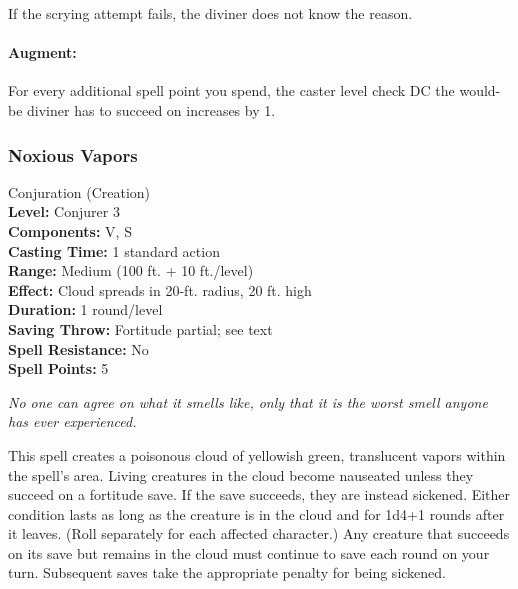 If the scrying attempt fails, the diviner does not know the reason.

\paragraph{Augment:} For every additional spell point you spend, the caster level check DC the would-be diviner has to succeed on increases by 1.
\subsubsection{Noxious Vapors}
\label{Spell:NoxiousVapors}
Conjuration (Creation)
\\ \textbf{Level:} Conjurer 3
\\ \textbf{Components:} V, S
\\ \textbf{Casting Time:} 1 standard action
\\ \textbf{Range:} Medium (100 ft. + 10 ft./level)
\\ \textbf{Effect:} Cloud spreads in 20-ft. radius, 20 ft. high
\\ \textbf{Duration:} 1 round/level
\\ \textbf{Saving Throw:} Fortitude partial; see text
\\ \textbf{Spell Resistance:} No
\\ \textbf{Spell Points:} 5

\emph{No one can agree on what it smells like, only that it is the worst smell anyone has ever experienced.}

This spell creates a poisonous cloud of yellowish green, translucent vapors within the spell's area.
Living creatures in the cloud become nauseated unless they succeed on a fortitude save.
If the save succeeds, they are instead sickened.
Either condition lasts as long as the creature is in the cloud and for 1d4+1 rounds after it leaves. 
(Roll separately for each affected character.) 
Any creature that succeeds on its save but remains in the cloud must continue to save each round on your turn.
Subsequent saves take the appropriate penalty for being sickened.

